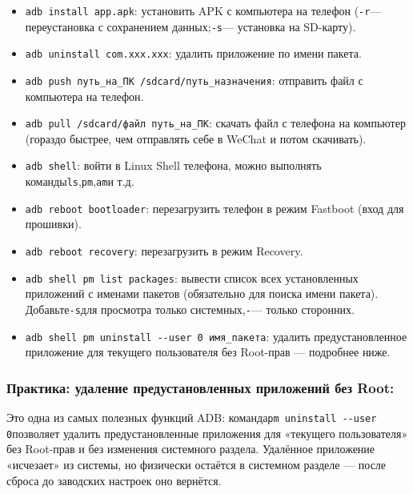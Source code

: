 \begin{itemize}
  \item \texttt{adb install app.\allowbreak apk}: установить APK с компьютера на телефон (\texttt{-\allowbreak r}— переустановка с сохранением данных;\texttt{-\allowbreak s}— установка на SD-карту).
  \item \texttt{adb uninstall com.\allowbreak xxx.\allowbreak xxx}: удалить приложение по имени пакета.
  \item \texttt{adb push путь\_на\_ПК /\allowbreak sdcard/\allowbreak путь\_назначения}: отправить файл с компьютера на телефон.
  \item \texttt{adb pull /\allowbreak sdcard/\allowbreak файл путь\_на\_ПК}: скачать файл с телефона на компьютер (гораздо быстрее, чем отправлять себе в WeChat и потом скачивать).
  \item \texttt{adb shell}: войти в Linux Shell телефона, можно выполнять команды\texttt{ls},\texttt{pm},\texttt{am}и т.д.
  \item \texttt{adb reboot bootloader}: перезагрузить телефон в режим Fastboot (вход для прошивки).
  \item \texttt{adb reboot recovery}: перезагрузить в режим Recovery.
  \item \texttt{adb shell pm list packages}: вывести список всех установленных приложений с именами пакетов (обязательно для поиска имени пакета). Добавьте\texttt{-\allowbreak s}для просмотра только системных,\texttt{-}— только сторонних.
  \item \texttt{adb shell pm uninstall -\allowbreak -\allowbreak user 0 имя\_пакета}: удалить предустановленное приложение для текущего пользователя без Root-прав — подробнее ниже.
\end{itemize}

\subsubsection*{Практика: удаление предустановленных приложений без Root:}

Это одна из самых полезных функций ADB: команда\texttt{pm uninstall -\allowbreak -\allowbreak user 0}позволяет удалить предустановленные приложения для «текущего пользователя» без Root-прав и без изменения системного раздела. Удалённое приложение «исчезает» из системы, но физически остаётся в системном разделе — после сброса до заводских настроек оно вернётся.

